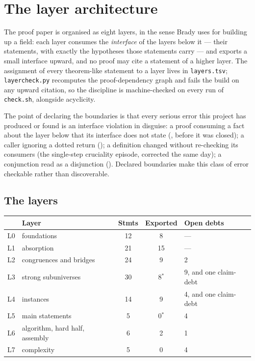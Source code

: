 \section{The layer architecture}\label{sec:layers}

The proof paper is organised as eight layers, in the sense Brady uses for
building up a field: each layer consumes the \emph{interface} of the layers
below it --- their statements, with exactly the hypotheses those statements
carry --- and exports a small interface upward, and no proof may cite a
statement of a higher layer. The assignment of every theorem-like statement to
a layer lives in \texttt{layers.tsv}; \texttt{layercheck.py} recomputes the
proof-dependency graph and fails the build on any upward citation, so the
discipline is machine-checked on every run of \texttt{check.sh}, alongside
acyclicity.

The point of declaring the boundaries is that every serious error this project
has produced or found is an interface violation in disguise: a proof consuming
a fact about the layer below that its interface does not state
(, before it was closed); a caller ignoring a
dotted return (); a definition changed without
re-checking its consumers (the single-step cruciality episode, corrected the
same day); a conjunction read as a disjunction (). Declared
boundaries make this class of error checkable rather than discoverable.

\subsection{The layers}

\begin{center}\small
\begin{tabular}{@{}clccl@{}}
\hline
 & Layer & Stmts & Exported & Open debts \\
\hline
L0 & foundations & 12 & 8 & --- \\
L1 & absorption & 21 & 15 & --- \\
L2 & congruences and bridges & 24 & 9 & 2 \\
L3 & strong subuniverses & 30 & 8$^{*}$ & 9, and one claim-debt \\
L4 & instances & 14 & 9 & 4, and one claim-debt \\
L5 & main statements & 5 & 0$^{*}$ & 4 \\
L6 & algorithm, hard half, assembly & 6 & 2 & 1 \\
L7 & complexity & 5 & 0 & 4 \\
\hline
\end{tabular}
\end{center}

